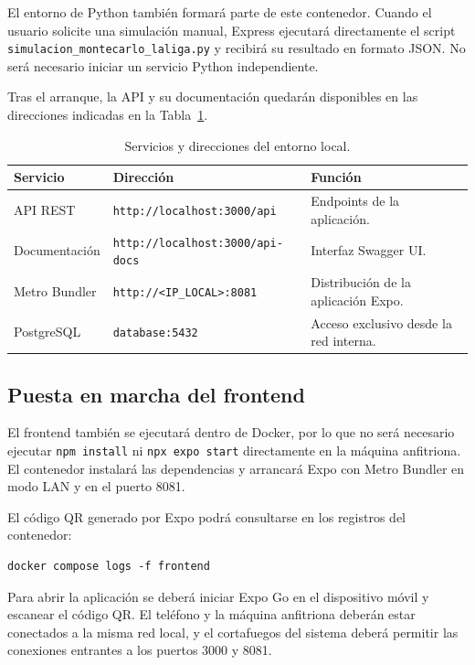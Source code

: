 El entorno de Python tambi\'en formar\'a parte de este contenedor. Cuando el usuario
solicite una simulaci\'on manual, Express ejecutar\'a directamente el script
\texttt{simulacion\_montecarlo\_laliga.py} y recibir\'a su resultado en formato
JSON. No ser\'a necesario iniciar un servicio Python independiente.

Tras el arranque, la API y su documentaci\'on quedar\'an disponibles en las
direcciones indicadas en la Tabla~\ref{tab:servicios-expuestos}.

\begin{table}[H]
\centering
\caption{Servicios y direcciones del entorno local.}
\label{tab:servicios-expuestos}
\begin{tabular}{|p{3.4cm}|p{5.6cm}|p{4cm}|}
\hline
\textbf{Servicio} & \textbf{Direcci\'on} & \textbf{Funci\'on} \\
\hline
API REST & \texttt{http://localhost:3000/api} & Endpoints de la aplicaci\'on. \\
\hline
Documentaci\'on & \texttt{http://localhost:3000/api-docs} & Interfaz Swagger UI. \\
\hline
Metro Bundler & \texttt{http://<IP\_LOCAL>:8081} & Distribuci\'on de la aplicaci\'on Expo. \\
\hline
PostgreSQL & \texttt{database:5432} & Acceso exclusivo desde la red interna. \\
\hline
\end{tabular}
\end{table}

\subsection{Puesta en marcha del frontend}

El frontend tambi\'en se ejecutar\'a dentro de Docker, por lo que no ser\'a
necesario ejecutar \texttt{npm install} ni \texttt{npx expo start} directamente
en la m\'aquina anfitriona. El contenedor instalar\'a las dependencias y arrancar\'a
Expo con Metro Bundler en modo LAN y en el puerto 8081.

El c\'odigo QR generado por Expo podr\'a consultarse en los registros del
contenedor:

\begin{lstlisting}
docker compose logs -f frontend
\end{lstlisting}

Para abrir la aplicaci\'on se deber\'a iniciar Expo Go en el dispositivo m\'ovil y
escanear el c\'odigo QR. El tel\'efono y la m\'aquina anfitriona deber\'an estar
conectados a la misma red local, y el cortafuegos del sistema deber\'a permitir las
conexiones entrantes a los puertos 3000 y 8081.

